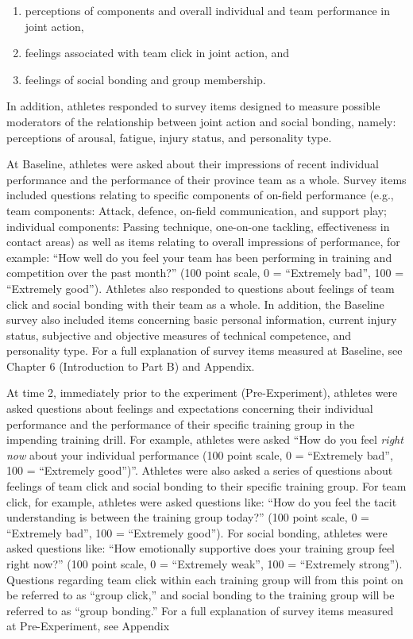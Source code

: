 \begin{enumerate}
  \item perceptions of components and overall individual and team performance in joint action,
  \item feelings associated with team click in joint action, and
  \item feelings of social bonding and group membership.

\end{enumerate}

In addition, athletes responded to survey items designed to measure possible moderators of the relationship between joint action and social bonding, namely: perceptions of arousal, fatigue, injury status, and personality type.


At Baseline, athletes were asked about their impressions of recent individual performance and the performance of their province team as a whole.  Survey items included questions relating to specific components of on-field performance (e.g., team components: Attack, defence, on-field communication, and support play; individual components: Passing technique, one-on-one tackling, effectiveness in contact areas) as well as items relating to overall impressions of performance, for example: ``How well do you feel your team has been performing in training and competition over the past month?'' (100 point scale, 0 = ``Extremely bad'', 100 = ``Extremely good'').  Athletes also responded to questions about feelings of team click and social bonding with their team as a whole. In addition, the Baseline survey also included items concerning basic personal information, current injury status, subjective and objective measures of technical competence, and personality type.
For a full explanation of survey items measured at Baseline, see Chapter 6 (Introduction to Part B) and Appendix.

At time 2, immediately prior to the experiment (Pre-Experiment), athletes were asked questions about feelings and expectations concerning their individual performance and the performance of their specific training group in the impending training drill.
For example,  athletes were asked ``How do you feel \textit{right now} about your individual performance (100 point scale, 0 = ``Extremely bad'', 100 = ``Extremely good'')''.  Athletes were also asked a series of questions about feelings of team click and social bonding to their specific training group. For team click, for example, athletes were asked questions like: ``How do you feel the tacit understanding is between the training group today?'' (100 point scale, 0 = ``Extremely bad'', 100 = ``Extremely good'').  For social bonding, athletes were asked questions like: ``How emotionally supportive does your training group feel right now?'' (100 point scale, 0 = ``Extremely weak'', 100 = ``Extremely strong'').  Questions regarding team click within each training group will from this point on be referred to as ``group click,'' and social bonding to the training group will be referred to as ``group bonding.'' For a full explanation of survey items measured at Pre-Experiment, see Appendix

